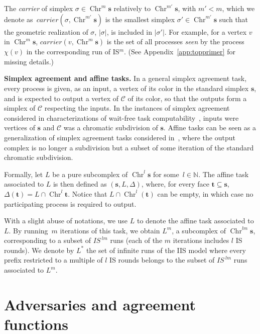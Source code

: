 \documentclass[a4paper]{article}
\newcommand{\myparagraph}[1]{\vspace{6pt}\noindent \textbf{#1}}
\def\C{\ensuremath{\mathcal{C}}}
\def\s {\mathbf{s}}
\def\t {\mathbf{t}}
\def\Chr{\operatorname{Chr}}
\def\Car{\mathit{carrier}}
\def\IS{\textit{IS}}
\begin{document}
The \emph{carrier} of simplex $\sigma\in\Chr^m\s$ relatively to $\Chr^{m'}\s$, 
with $m'<m$, which we denote as~$\Car(\sigma,\Chr^{m'}\s)$ is 
the smallest simplex $\sigma'\in\Chr^{m'}\s$ such that the geometric 
realization of $\sigma$, $|\sigma|$, is included in $|\sigma'|$. 
For example, for a vertex $v$ in $\Chr^m\s$, 
$\Car(v,\Chr^m\s)$ is the set of all processes \emph{seen} by 
the process~$\chi(v)$ in the corresponding run of IS$^m$.
(See Appendix~\ref{app:topprimer} for missing details.)

\myparagraph{Simplex agreement and affine tasks.}
In a general simplex agreement task, every process is given, as an
input, a vertex of its color in the standard simplex $\s$, and is
expected to output a vertex of $\C$ of its color, so that the outputs
form a simplex of $\C$ respecting the inputs.   
In the instances of simplex agreement considered in characterizations
of wait-free task computability~\cite{BG97,HS99}, inputs were vertices
of $\s$ and $\C$ was a chromatic subdivision of $\s$.
%
Affine tasks can be seen as a generalization of simplex agreement
tasks considered in~\cite{BG97,HS99}, where the output 
complex is no longer a subdivision but a subset of some 
iteration of the standard chromatic subdivision.

Formally, let $L$ be a pure subcomplex of $\Chr^l\s$ for some~$l\in \mathbb{N}$.
The affine task associated to $L$ is then defined as $(\s,L,\Delta)$, 
where, for every face 
$\t \subseteq \s$, $\Delta(\t) = L \cap \Chr^l \t$.
Notice that $L \cap \Chr^l(\t)$ can be empty, in which case no
participating process is required to output.

With a slight abuse of 
notations, we use $L$ to denote the affine task 
associated to $L$. 
By running~$m$ iterations of this task, we obtain $L^m$, a 
subcomplex of $\Chr^{lm}\s$, corresponding to a subset of 
$\IS^{~lm}$ runs (each of the $m$ iterations includes $l$ IS rounds). We 
denote by $L^*$ the set of infinite runs of the IIS model where 
every prefix restricted to a multiple of $l$ IS rounds 
belongs to the subset of $\IS^{~lm}$ runs associated to $L^m$.

\section{Adversaries and agreement functions}
\label{sec:adv}
\end{document}

